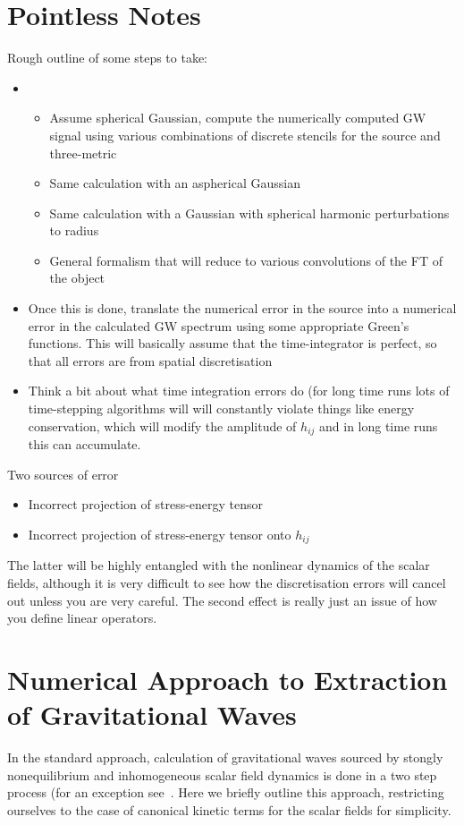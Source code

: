 \documentclass{revtex4}
\begin{document}
\section{Pointless Notes}
Rough outline of some steps to take:
\begin{itemize}
\item
  \begin{itemize}
  \item Assume spherical Gaussian, compute the numerically computed GW signal using various combinations of discrete stencils for the source and three-metric
  \item Same calculation with an aspherical Gaussian
  \item Same calculation with a Gaussian with spherical harmonic perturbations to radius
  \item General formalism that will reduce to various convolutions of the FT of the object
  \end{itemize}
\item Once this is done, translate the numerical error in the source into a numerical error in the calculated GW spectrum using some appropriate Green's functions.  This will basically assume that the time-integrator is perfect, so that all errors are from spatial discretisation
\item Think a bit about what time integration errors do (for long time runs lots of time-stepping algorithms will will constantly violate things like energy conservation, which will modify the amplitude of $h_{ij}$ and in long time runs this can accumulate.
\end{itemize}

Two sources of error
\begin{itemize}
\item Incorrect projection of stress-energy tensor
\item Incorrect projection of stress-energy tensor onto $h_{ij}$
\end{itemize}
The latter will be highly entangled with the nonlinear dynamics of the scalar fields, although it is very difficult to see how the discretisation errors will cancel out unless you are very careful.
The second effect is really just an issue of how you define linear operators.

\section{Numerical Approach to Extraction of Gravitational Waves}
In the standard approach, calculation of gravitational waves sourced by stongly nonequilibrium and inhomogeneous scalar field dynamics is done in a two step process (for an exception see~\cite{Huang:HLattice,Bastero-Gil}.
Here we briefly outline this approach, restricting ourselves to the case of canonical kinetic terms for the scalar fields for simplicity.
\end{document}
